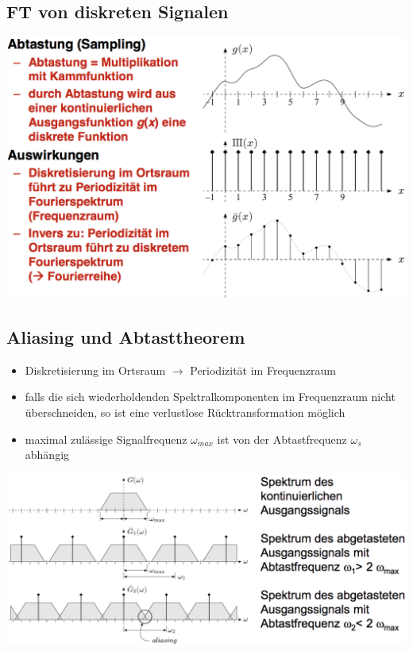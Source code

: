 \documentclass[10pt]{article}
\begin{document}
\subsection{FT von diskreten Signalen}
\begin{center}
	\includegraphics[scale=0.225]{ft-diskrete-signale.png}
\end{center}

\subsection{Aliasing und Abtasttheorem}
\begin{itemize}
	\item Diskretisierung im Ortsraum $\rightarrow$ Periodizität im Frequenzraum
	\item falls die sich wiederholdenden Spektralkomponenten im Frequenzraum nicht überschneiden, so ist eine verlustlose Rücktransformation möglich
	\item maximal zulässige Signalfrequenz $\omega_{max}$ ist von der Abtastfrequenz $\omega_s$ abhängig
\end{itemize}
\begin{center}
	\includegraphics[scale=0.225]{ft-abtasttheorem.png}
\end{center}
\end{document}
